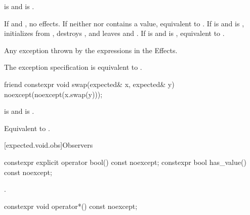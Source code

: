 \begin{itemdescr}
\pnum
\constraints
{} is  and  is .

\pnum
\effects
If  and , no effects. If neither  nor  contains a value, equivalent to . If  is  and  is , initializes  from , destroys , and leaves   and  . If  is  and  is , equivalent to .

\pnum
\throws
Any exception thrown by the expressions in the Effects.

\pnum
\remarks
The exception specification is equivalent to .
\end{itemdescr}

%
\begin{itemdecl}
friend constexpr void swap(expected& x, expected& y) noexcept(noexcept(x.swap(y)));
\end{itemdecl}

\begin{itemdescr}
\pnum
\constraints
{} is  and  is .

\pnum
\effects
Equivalent to .
\end{itemdescr}

[expected.void.obs]{Observers}

%
%
\begin{itemdecl}
constexpr explicit operator bool() const noexcept;
constexpr bool has_value() const noexcept;
\end{itemdecl}

\begin{itemdescr}
\pnum
\returns
{}.
\end{itemdescr}

%
\begin{itemdecl}
constexpr void operator*() const noexcept;
\end{itemdecl}

